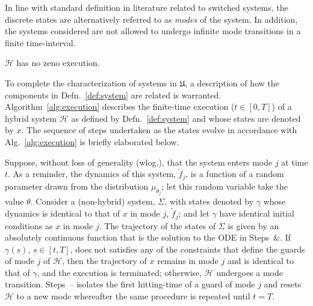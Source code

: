 In line with standard definition in literature related to switched systems, the discrete states are alternatively referred to as {\em modes} of the system. In addition, the systems considered are not allowed to undergo infinite mode transitions in a finite time-interval.
\begin{assump}
  $\mathcal H$ has no zeno execution.
  \label{assump:zeno}
\end{assump}
To complete the characterization of systems in $\mathfrak{U}$, a description of how the components in Defn.~\ref{def:system} are related is warranted. Algorithm~\ref{alg:execution} describes the finite-time execution ($t\in [0,T]$) of a hybrid system $\mathcal H$ as defined by Defn.~\ref{def:system} and whose states are denoted by $x$. The sequence of steps undertaken as the states evolve in accordance with Alg.~\ref{alg:execution} is briefly elaborated below.
\par
Suppose, without loss of generality (wlog.), that the system enters mode $j$ at time $t$. As a reminder, the dynamics of this system, $\tilde f_j$, is a function of a random parameter drawn from the distribution $\mu_{\theta_j}$; let this random variable take the value $\theta$. Consider a (non-hybrid) system, $\Sigma$, with states denoted by $\gamma$ whose dynamics is identical to that of $x$ in mode $j$, $\tilde f_j$; and let $\gamma$ have identical initial conditions as $x$ in mode $j$. The trajectory of the states of $\Sigma$ is given by an absolutely continuous function that is the solution to the ODE in Steps~\&. If $\gamma(s),\,s\in [t,T]$, does not satisfies any of the constraints that define the guards of mode $j$ of $\mathcal H$, then the trajectory of $x$ remains in mode $j$ and is identical to that of $\gamma$, and the execution is terminated; otherwise, $\mathcal H$ undergoes a mode transition. Steps~-- isolates the first hitting-time of a guard of mode $j$ and resets $\mathcal H$ to a new mode whereafter the same procedure is repeated until $t=T$.
\par

